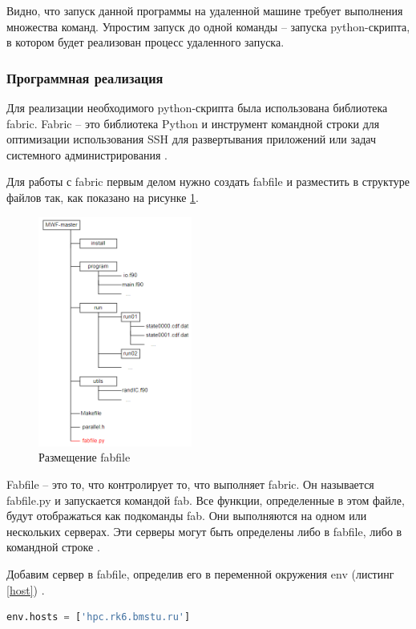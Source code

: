 Видно, что запуск данной программы на удаленной машине требует выполнения множества команд. Упростим запуск до одной команды -- запуска python-скрипта, в котором будет реализован процесс удаленного запуска.

\subsubsection{Программная реализация}

Для реализации необходимого python-скрипта была использована библиотека fabric. Fabric – это библиотека Python и инструмент командной строки для оптимизации использования SSH для развертывания приложений или задач системного администрирования \cite{fabric-doc}.

Для работы с fabric первым делом нужно создать fabfile и разместить в структуре файлов так, как показано на рисунке \ref{structure_fab}.
\begin{figure}[!ht]
	\centering
	\includegraphics[width=0.45\textwidth]{ResearchNotes/rndcmp_not_rcs_2022_06_17/MWF-иерархия_fab.png}
	\caption{Размещение fabfile}\label{structure_fab}
\end{figure} 

Fabfile -- это то, что контролирует то, что выполняет fabric. Он называется fabfile.py и запускается командой fab. Все функции, определенные в этом файле, будут отображаться как подкоманды fab. Они выполняются на одном или нескольких серверах. Эти серверы могут быть определены либо в fabfile, либо в командной строке \cite{fabric-fab}.

Добавим сервер в fabfile, определив его в переменной окружения env (листинг \ref{host}) \cite{fabric-env}. 
\begin{lstlisting}[label=host, language=Python, caption=Добавление сервера в переменную окружения env] 
        env.hosts = ['hpc.rk6.bmstu.ru']
\end{lstlisting}

